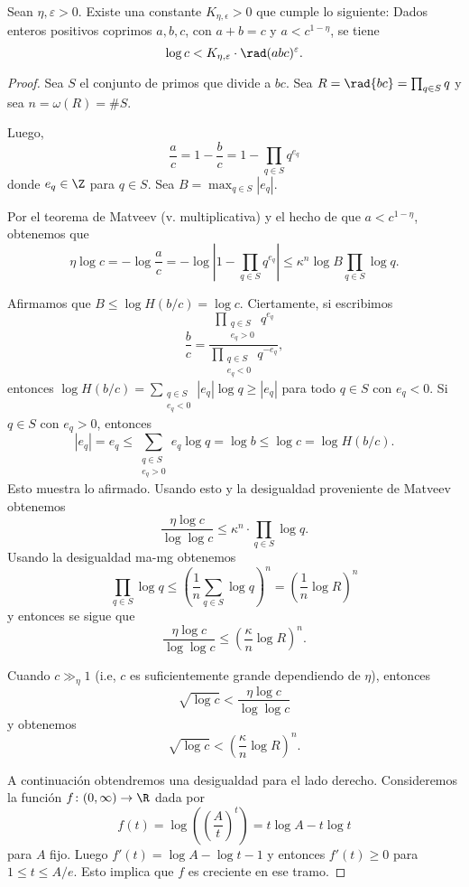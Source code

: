 \documentclass[11pt, reqno]{amsart}
\begin{document}
\begin{thm}[Pastén, 2022]
	Sean $\eta,\varepsilon>0$. Existe una constante $K_{\eta,\epsilon}>0$ que cumple lo siguiente:
	Dados enteros positivos coprimos $a,b,c$, con $a+b=c$ y $a<c^{1-\eta}$, se tiene $$\log c<K_{\eta,\varepsilon}\cdot \rad(abc)^{\varepsilon}.$$
\end{thm}
\begin{proof}
	Sea $S$ el conjunto de primos que divide a $bc$. Sea $R=\rad{bc}=\prod_{q\in S}q$ y sea $n=\omega(R)=\#S$. 

	Luego, $$\frac{a}{c}=1-\frac{b}{c}=1-\prod_{q\in S}q^{e_q}$$ donde $e_q\in \Z$ para $q\in S$. Sea $B=\max_{q\in S}|e_q|$. 

	Por el teorema de Matveev (v. multiplicativa) y el hecho de que $a<c^{1-\eta}$, obtenemos que $$\eta\log c=-\log\frac{a}{c}=-\log\left|1-\prod_{q\in S}q^{e_q}\right|\leq \kappa^n\log B\prod_{q\in S}\log q.$$

	Afirmamos que $B\leq \log H(b/c)=\log c$. Ciertamente, si escribimos
	\[
		\frac{b}{c}=\frac{\displaystyle\prod_{\substack{q\in S \\ e_q>0}}q^{e_q}}{\displaystyle\prod_{\substack{q\in S \\ e_q<0}}q^{-e_q}},
	\]
	entonces $\log H(b/c)=\sum_{\substack{q\in S\\e_q<0}}|e_q|\log q\geq |e_q|$ para todo $q\in S$ con $e_q<0$. Si $q\in S$ con $e_q>0$, entonces
	\[
		|e_q|=e_q\leq \sum_{\substack{q\in S\\ e_q>0}}e_q\log q=\log b\leq \log c=\log H(b/c).
	\]
	Esto muestra lo afirmado. Usando esto y la desigualdad proveniente de Matveev obtenemos $$\frac{\eta\log c}{\log\log c}\leq \kappa^n\cdot\prod_{q\in S}\log q.$$ Usando la desigualdad ma-mg obtenemos
	\[
		\prod_{q\in S}\log q\leq\left( \frac{1}{n}\sum_{q\in S}\log q \right)^n=\left( \frac{1}{n}\log R \right)^n
	\]
	y entonces se sigue que $$\frac{\eta\log c}{\log\log c}\leq \left( \frac{\kappa}{n}\log R \right)^n.$$

	Cuando $c\gg_{\eta} 1$ (i.e, $c$ es suficientemente grande dependiendo de $\eta$), entonces $$\sqrt{\log c}<\frac{\eta\log c}{\log\log c}$$ y obtenemos $$\sqrt{\log c}<\left( \frac{\kappa}{n}\log R \right)^n.$$

	A continuación obtendremos una desigualdad para el lado derecho. Consideremos la función $f\colon (0,\infty)\to \R$ dada por
	\[
		f(t)=\log\mathopen{}\left( \left( \frac{A}{t} \right)^t \right)\mathclose{} = t\log A-t\log t
	\]
	para $A$ fijo. Luego $f'(t)=\log A-\log t-1$ y entonces $f'(t)\geq 0$ para $1\leq t\leq A/e$. Esto implica que $f$ es creciente en ese tramo.


\end{proof}
\end{document}
